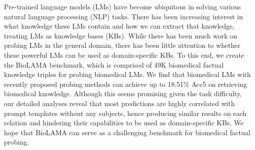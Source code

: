 Pre-trained language models (LMs) have become ubiquitous in solving various natural language processing (NLP) tasks. There has been increasing interest in what knowledge these LMs contain and how we can extract that knowledge, treating LMs as knowledge bases (KBs). While there has been much work on probing LMs in the general domain, there has been little attention to whether these powerful LMs can be used as domain-specific KBs. To this end, we create the BioLAMA benchmark, which is comprised of 49K biomedical factual knowledge triples for probing biomedical LMs. We find that biomedical LMs with recently proposed probing methods can achieve up to 18.51\% Acc\@5 on retrieving biomedical knowledge. Although this seems promising given the task difficulty, our detailed analyses reveal that most predictions are highly correlated with prompt templates without any subjects, hence producing similar results on each relation and hindering their capabilities to be used as domain-specific KBs. We hope that BioLAMA can serve as a challenging benchmark for biomedical factual probing.
